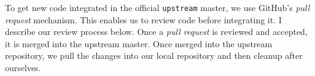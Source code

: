 
%

To get new code integrated in the official \texttt{upstream} master, we use
GitHub's \emph{pull request} mechanism.  This enables us to review code
before integrating it.  I describe our review process below.
Once a \emph{pull request} is reviewed and accepted, it is merged into
the upstream master.  Once merged into the upstream repository, we pull
the changes into our local repository and then cleanup after ourselves.


